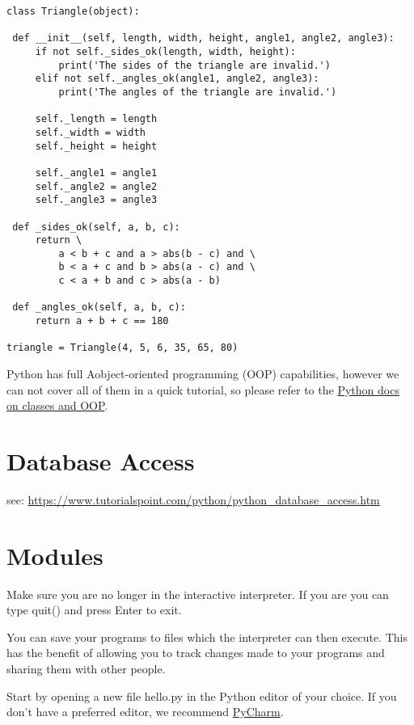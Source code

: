 \begin{verbatim}
class Triangle(object):

 def __init__(self, length, width, height, angle1, angle2, angle3):
     if not self._sides_ok(length, width, height):
         print('The sides of the triangle are invalid.')
     elif not self._angles_ok(angle1, angle2, angle3):
         print('The angles of the triangle are invalid.')

     self._length = length
     self._width = width
     self._height = height

     self._angle1 = angle1
     self._angle2 = angle2
     self._angle3 = angle3

 def _sides_ok(self, a, b, c):
     return \
         a < b + c and a > abs(b - c) and \
         b < a + c and b > abs(a - c) and \
         c < a + b and c > abs(a - b)

 def _angles_ok(self, a, b, c):
     return a + b + c == 180

triangle = Triangle(4, 5, 6, 35, 65, 80)
\end{verbatim}

Python has full Aobject-oriented programming (OOP) capabilities, however
we can not cover all of them in a quick tutorial, so please refer to the
\href{https://docs.python.org/2.7/tutorial/classes.html}{Python docs on
classes and OOP}.

\section{Database Access}\label{database-access}

see:
\url{https://www.tutorialspoint.com/python/python_database_access.htm}

\section{Modules}\label{modules}

Make sure you are no longer in the interactive interpreter. If you are
you can type quit() and press Enter to exit.

You can save your programs to files which the interpreter can then
execute. This has the benefit of allowing you to track changes made to
your programs and sharing them with other people.

Start by opening a new file hello.py in the Python editor of your
choice. If you don't have a preferred editor, we recommend
\href{https://www.jetbrains.com/pycharm/}{PyCharm}.

